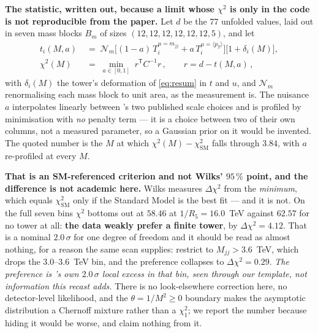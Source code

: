 \documentclass[11pt,a4paper]{article}
\begin{document}
\noindent\textbf{The statistic, written out, because a limit whose $\chi^2$ is only in the code is
not reproducible from the paper.} Let $d$ be the $77$ unfolded values, laid out in seven mass
blocks $B_m$ of sizes $(12,12,12,12,12,12,5)$, and let
\begin{equation}\label{eq:chisq}
\begin{aligned}
  t_i(M,a)\;&=\;\mathcal N_m\Big[(1-a)\,T_i^{\mu=m_{jj}}
             +a\,T_i^{\mu=\langle p_T\rangle}\Big]\big[1+\delta_i(M)\big],\\[2pt]
  \chi^2(M)\;&=\;\min_{a\in[0,1]}\;r^{\mathsf T}C^{-1}r\,,\qquad r=d-t(M,a)\,,
\end{aligned}
\end{equation}
with $\delta_i(M)$ the tower's deformation of \eqref{eq:resum} in $t$ and $u$, and $\mathcal N_m$
renormalising each mass block to unit area, as the measurement is. The nuisance $a$ interpolates
linearly between \cite{CMSangular}'s two published scale choices and is profiled by minimisation
with \emph{no} penalty term --- it is a choice between two of their own columns, not a measured
parameter, so a Gaussian prior on it would be invented. The quoted number is the $M$ at which
$\chi^2(M)-\chi^2_{\mathrm{SM}}$ falls through $3.84$, with $a$ re-profiled at every $M$.

\noindent\textbf{That is an SM-referenced criterion and not Wilks' $95\,\%$ point, and the
difference is not academic here.} Wilks measures $\Delta\chi^2$ from the \emph{minimum}, which
equals $\chi^2_{\mathrm{SM}}$ only if the Standard Model is the best fit --- and it is not. On the
full seven bins $\chi^2$ bottoms out at $58.46$ at $1/R_5=16.0$~TeV against $62.57$ for no tower at
all: \textbf{the data weakly prefer a finite tower}, by $\Delta\chi^2=4.12$. That is a nominal
$2.0\,\sigma$ for one degree of freedom and it should be read as almost nothing, for a reason the
same scan supplies: restrict to $M_{jj}>3.6$~TeV, which drops the $3.0$--$3.6$~TeV bin, and the
preference collapses to $\Delta\chi^2=0.29$. \emph{The preference is \cite{CMSangular}'s own
$2.0\,\sigma$ local excess in that bin, seen through our template, not information this recast
adds.} There is no look-elsewhere correction here, no detector-level likelihood, and the
$\theta=1/M^2\ge0$ boundary makes the asymptotic distribution a Chernoff mixture rather than a
$\chi^2_1$; we report the number because hiding it would be worse, and claim nothing from it.
\end{document}
